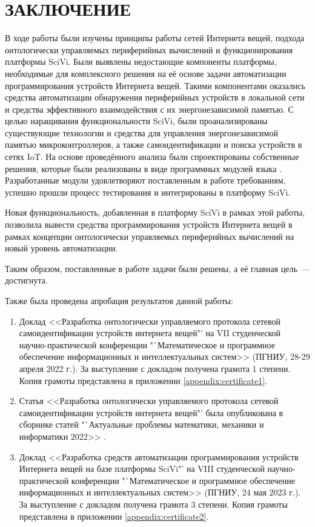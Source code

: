 \chapter*{ЗАКЛЮЧЕНИЕ}

В ходе работы были изучены принципы работы сетей Интернета вещей, подхода онтологически управляемых периферийных вычислений и функционирования платформы SciVi. Были выявлены недостающие компоненты платформы, необходимые для комплексного решения на её основе задачи автоматизации программирования устройств Интернета вещей. Такими компонентами оказались средства автоматизации обнаружения периферийных устройств в локальной сети и средства эффективного взаимодействия с их энергонезависимой памятью.
С целью наращивания функциональности SciVi, были проанализированы существующие технологии и средства для управления энергонезависимой памятью микроконтроллеров, а также самоидентификации и поиска устройств в сетях IoT.
На основе проведённого анализа были спроектированы собственные решения, которые были реализованы в виде программных модулей языка \CPP.
Разработанные модули удовлетворяют поставленным в работе требованиям, успешно прошли процесс тестирования и интегрированы в платформу SciVi.

Новая функциональность, добавленная в платформу SciVi в рамках этой работы, позволила вывести средства программирования устройств Интернета вещей в рамках концепции онтологически управляемых периферийных вычислений на новый уровень автоматизации.

Таким образом, поставленные в работе задачи были решены, а её главная цель~--- достигнута.

Также была проведена апробация результатов данной работы:
\begin{enumerate}
	\item Доклад <<Разработка онтологически управляемого протокола сетевой самоидентификации устройств интернета вещей"' на VII студенческой научно-практической конференции "`Математическое и программное обеспечение информационных и интеллектуальных систем>> (ПГНИУ, 28-29 апреля 2022 г.).
	За выступление с докладом получена грамота 1 степени. Копия грамоты представлена в приложении \ref{appendix:certificate1}.
	\item Статья <<Разработка онтологически управляемого протокола сетевой самоидентификации устройств интернета вещей"' была опубликована в сборнике статей "`Актуальные проблемы математики, механики и информатики 2022>> \cite{incollection:odec-self-id-protocol}.
	\item Доклад <<Разработка средств автоматизации программирования устройств Интернета вещей на базе платформы SciVi"' на VIII студенческой научно-практической конференции "`Математическое и программное обеспечение информационных и интеллектуальных систем>> (ПГНИУ, 24 мая 2023 г.).
	За выступление с докладом получена грамота 3 степени. Копия грамоты представлена в приложении \ref{appendix:certificate2}.
\end{enumerate}
